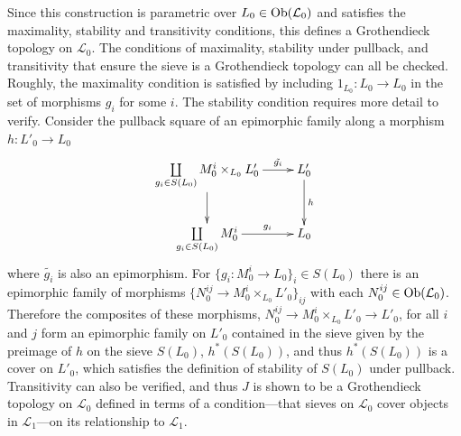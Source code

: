 \documentclass[aps,twocolumn]{revtex4-1}
\begin{document}
Since this construction is parametric over $L_0 \in \mathop{\rm Ob}\nolimits(\mathcal{L}_0)$ and satisfies the maximality, stability and transitivity conditions, this defines a Grothendieck topology on $\mathcal{L}_0$. The conditions of maximality, stability under pullback, and transitivity that ensure the sieve is a Grothendieck topology can all be checked. Roughly, the maximality condition is satisfied by including $1_{L_0} : L_0 \rightarrow L_0$ in the set of morphisms $g_i$ for some $i$. The stability condition requires more detail to verify. Consider the pullback square of an epimorphic family along a morphism $h:L'_0 \rightarrow L_0$
\begin{displaymath}
\xymatrix{
\coprod\limits_{g_i \in S(L_0)} M_0^i \times_{L_0} L'_0 \ar[r]^-{\tilde{g_i}} \ar[d]_{} & L'_0 \ar[d]^{h} \\
\coprod\limits_{g_i \in S(L_0)} M_0^i \ar[r]^-{g_i} & L_0
}
\end{displaymath}
where $\tilde{g_i}$ is also an epimorphism. For $\{ g_i : M_0^i \rightarrow L_0 \}_i \in S(L_0)$ there is an epimorphic family of morphisms $\{ N_0^{ij} \rightarrow M_0^i \times_{L_0} L'_0 \}_{ij}$ with each $N_0^{ij} \in \mathop{\rm Ob}\nolimits(\mathcal{L}_0)$. Therefore the composites of these morphisms, $N_0^{ij} \rightarrow M_0^i \times_{L_0} L'_0 \rightarrow L'_0$, for all $i$ and $j$ form an epimorphic family on $L'_0$ contained in the sieve given by the preimage of $h$ on the sieve $S(L_0)$, $h^*(S(L_0))$, and thus $h^*(S(L_0))$ is a cover on $L'_0$, which satisfies the definition of stability of $S(L_0)$ under pullback. Transitivity can also be verified, and thus $J$ is shown to be a Grothendieck topology on $\mathcal{L}_0$ defined in terms of a condition---that sieves on $\mathcal{L}_0$ cover objects in $\mathcal{L}_1$---on its relationship to $\mathcal{L}_1$.
\end{document}
